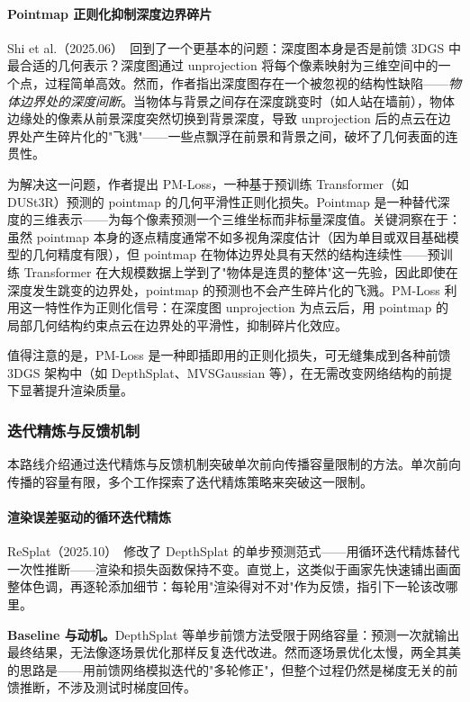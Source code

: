 \paragraph{Pointmap 正则化抑制深度边界碎片}

Shi et al.（2025.06）~\cite{2506_05327}回到了一个更基本的问题：深度图本身是否是前馈 3DGS 中最合适的几何表示？深度图通过 unprojection 将每个像素映射为三维空间中的一个点，过程简单高效。然而，作者指出深度图存在一个被忽视的结构性缺陷——\emph{物体边界处的深度间断}。当物体与背景之间存在深度跳变时（如人站在墙前），物体边缘处的像素从前景深度突然切换到背景深度，导致 unprojection 后的点云在边界处产生碎片化的"飞溅"——一些点飘浮在前景和背景之间，破坏了几何表面的连贯性。

为解决这一问题，作者提出 PM-Loss，一种基于预训练 Transformer（如 DUSt3R）预测的 pointmap 的几何平滑性正则化损失。Pointmap 是一种替代深度的三维表示——为每个像素预测一个三维坐标而非标量深度值。关键洞察在于：虽然 pointmap 本身的逐点精度通常不如多视角深度估计（因为单目或双目基础模型的几何精度有限），但 pointmap 在物体边界处具有天然的结构连续性——预训练 Transformer 在大规模数据上学到了"物体是连贯的整体"这一先验，因此即使在深度发生跳变的边界处，pointmap 的预测也不会产生碎片化的飞溅。PM-Loss 利用这一特性作为正则化信号：在深度图 unprojection 为点云后，用 pointmap 的局部几何结构约束点云在边界处的平滑性，抑制碎片化效应。

值得注意的是，PM-Loss 是一种即插即用的正则化损失，可无缝集成到各种前馈 3DGS 架构中（如 DepthSplat、MVSGaussian 等），在无需改变网络结构的前提下显著提升渲染质量。

\subsubsection{迭代精炼与反馈机制}

本路线介绍通过迭代精炼与反馈机制突破单次前向传播容量限制的方法。单次前向传播的容量有限，多个工作探索了迭代精炼策略来突破这一限制。

\paragraph{渲染误差驱动的循环迭代精炼}

ReSplat（2025.10）~\cite{2510_08575}修改了 DepthSplat 的单步预测范式——用循环迭代精炼替代一次性推断——渲染和损失函数保持不变。直觉上，这类似于画家先快速铺出画面整体色调，再逐轮添加细节：每轮用"渲染得对不对"作为反馈，指引下一轮该改哪里。

\textbf{Baseline 与动机。}DepthSplat 等单步前馈方法受限于网络容量：预测一次就输出最终结果，无法像逐场景优化那样反复迭代改进。然而逐场景优化太慢，两全其美的思路是——用前馈网络模拟迭代的"多轮修正"，但整个过程仍然是梯度无关的前馈推断，不涉及测试时梯度回传。

